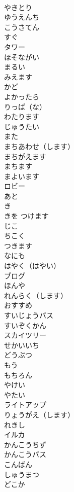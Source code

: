 \documentclass[8pt]{extreport}
\begin{document}
\begin{CJK}{UTF8}{min}
\\	やきとり	
\\	ゆうえんち	
\\	こうさてん	
\\	すぐ	
\\	タワー	
\\	ほそながい	
\\	まるい	
\\	みえます	
\\	かど	
\\	よかったら	
\\	りっぱ（な）	
\\	わたります	
\\	じゅうたい	
\\	また	
\\	まちあわせ（します）	
\\	まちがえます	
\\	まちます	
\\	まよいます	
\\	ロビー	
\\	あと	
\\	き	
\\	きを つけます	
\\	じこ	
\\	ちこく	
\\	つきます	
\\	なにも	
\\	はやく（はやい）	
\\	ブログ	
\\	ほんや	
\\	れんらく（します）	
\\	おすすめ	
\\	すいじょうバス	
\\	すいぞくかん	
\\	スカイツリー	
\\	せかいいち	
\\	どうぶつ	
\\	もう	
\\	もちろん	
\\	やけい	
\\	やたい	
\\	ライトアップ	
\\	りょうがえ（します）	
\\	れきし	
\\	イルカ	
\\	かんこうちず	
\\	かんこうバス	
\\	こんばん	
\\	しゅうまつ	
\\	どこか	

\end{CJK}
\end{document}
